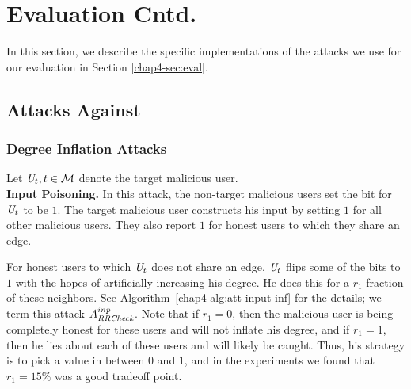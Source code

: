 \section{Evaluation Cntd.}\label{chap4-app:attacks}
In this section, we describe the specific implementations of the attacks we use for our evaluation in Section \ref{chap4-sec:eval}.

\subsection{Attacks Against \DegRRCheck{}}

\subsubsection{Degree Inflation Attacks}
Let $\textit{U}_t, t \in \mathcal{M}$ denote the target malicious user. 
\\
\noindent\textbf{Input Poisoning.} In this attack, the non-target malicious users set the bit for $\textit{U}_t$ to be $1$. The target malicious user constructs his input by setting $1$ for all other malicious users. They also report $1$ for honest users to which they share an edge. 

For honest users to which $\textit{U}_t$ does not share an edge, $\textit{U}_t$ flips some of the bits to $1$ with the hopes of artificially increasing his degree. He does this for a $r_1$-fraction of these neighbors. See Algorithm~\ref{chap4-alg:att-input-inf} for the details; we term this attack $A_{\textit{RRCheck}}^{inp}$. Note that if $r_1 = 0$, then the malicious user is being completely honest for these users and will not inflate his degree, and if $r_1 = 1$, then he lies about each of these users and will likely be caught. Thus, his strategy is to pick a value in between $0$ and $1$, and in the experiments we found that $r_1 = 15\%$ was a good tradeoff point.

